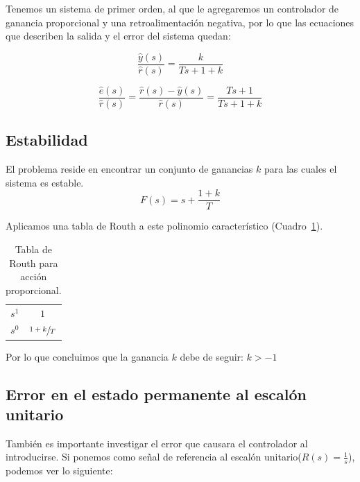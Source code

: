         Tenemos un sistema de primer orden, al que le agregaremos un controlador de ganancia proporcional y una retroalimentación negativa, por lo que las ecuaciones que describen la salida y el error del sistema quedan:

    \begin{equation}
        \frac{\hat{y}(s)}{\hat{r}(s)} = \frac{k}{Ts + 1 + k}
    \end{equation}

    \begin{equation}
        \frac{\hat{e}(s)}{\hat{r}(s)} = \frac{\hat{r}(s) - \hat{y}(s)}{\hat{r}(s)} = \frac{Ts + 1}{Ts + 1 + k}
    \end{equation}

        \subsection{Estabilidad}
            El problema reside en encontrar un conjunto de ganancias $k$ para las cuales el sistema es estable.
            \begin{equation}
                F(s) = s + \frac{1 + k}{T}
            \end{equation}

            Aplicamos una tabla de Routh a este polinomio característico (Cuadro~\ref{tab:AccionProporcional}).

            \begin{table}[htbp]
                \centering
                \begin{tabular}{c|c}
                $s^1$ & $1$ \\
                $s^0$ & $\sfrac{1+k}{T}$
                \end{tabular}
                \caption{\label{tab:AccionProporcional}Tabla de Routh para acción proporcional.}
            \end{table}

Por lo que concluimos que la ganancia $k$ debe de seguir: $k>-1$


        \subsection{Error en el estado permanente al escalón unitario}
            También es importante investigar el error que causara el controlador al introducirse. Si ponemos como señal de referencia al escalón unitario($R(s) = \frac{1}{s}$), podemos ver lo siguiente:


